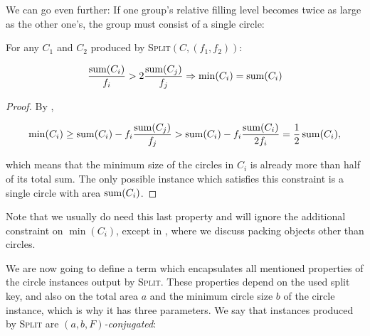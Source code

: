 \documentclass[a4paper,style=print,bibliography=totoc,nexus,lnum,extramargin]{tubsbook}
\begin{document}
We can go even further: If one group's relative filling level becomes twice as large as the other one's, the group must consist of a single circle:

\begin{lemma}\label{th:min2}
    For any $C_1$ and $C_2$ produced by \textsc{Split}$(C,(f_1,f_2))$:

    $$\frac{\operatorname{sum}(C_i)}{f_i} > 2\frac{\operatorname{sum}(C_j)}{f_j} \Rightarrow \min(C_i) = \operatorname{sum}(C_i)$$
\end{lemma}

\begin{proof}
    By ,

    $$\min(C_i) \ge \operatorname{sum}(C_i) - f_i\frac{\operatorname{sum}(C_j)}{f_j} > \operatorname{sum}(C_i) - f_i\frac{\operatorname{sum}(C_i)}{2f_i} = \frac{1}{2}\operatorname{sum}(C_i),$$

    which means that the minimum size of the circles in $C_i$ is already more than half of its total sum. The only possible instance which satisfies this constraint is a single circle with area $\operatorname{sum}(C_i)$.

\end{proof}

Note that we usually do need this last property and will ignore the additional constraint on $\min(C_i)$, except in , where we discuss packing objects other than circles.

We are now going to define a term which encapsulates all mentioned properties of the circle instances output by \textsc{Split}. These properties depend on the used split key, and also on the total area $a$ and the minimum circle size $b$ of the circle instance, which is why it has three parameters. We say that instances produced by \textsc{Split} are \emph{$(a,b,F)$-conjugated}:

\end{document}
